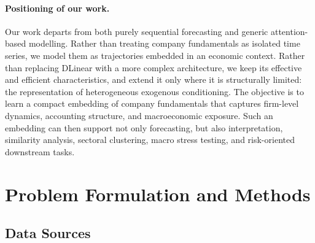 \documentclass[a4paper,fleqn]{cas-dc}
\begin{document}
\paragraph{Positioning of our work.}
Our work departs from both purely sequential forecasting and generic attention-based modelling. Rather than treating company fundamentals as isolated time series, we model them as trajectories embedded in an economic context. Rather than replacing DLinear with a more complex architecture, we keep its effective and efficient characteristics, and extend it only where it is structurally limited: the representation of heterogeneous exogenous conditioning. The objective is to learn a compact embedding of company fundamentals that captures firm-level dynamics, accounting structure, and macroeconomic exposure. Such an embedding can then support not only forecasting, but also interpretation, similarity analysis, sectoral clustering, macro stress testing, and risk-oriented downstream tasks.

\section{Problem Formulation and Methods}\label{sec:data}

\subsection{Data Sources} \label{sec:data_sources}
\end{document}
